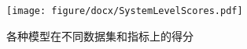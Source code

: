 \begin{figure}[H]
    \centering
    \texttt{[image: figure/docx/SystemLevelScores.pdf]}
    \caption{各种模型在不同数据集和指标上的得分}
    \label{fig:system_scores_all}
\end{figure}
